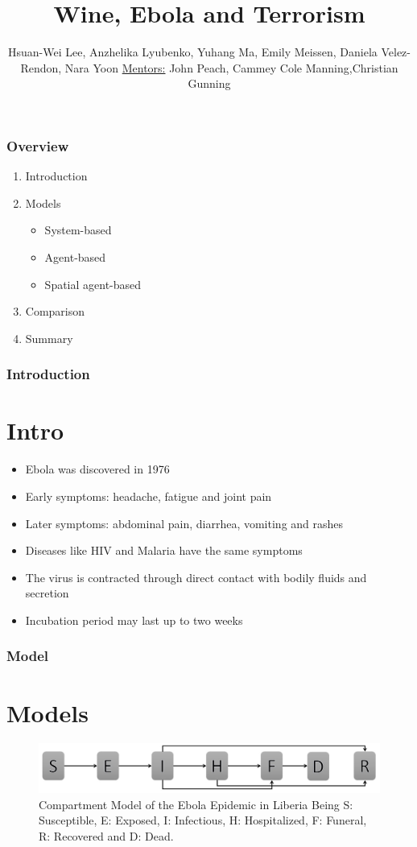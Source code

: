 \documentclass[30pt]{beamer}
\author{ Hsuan-Wei Lee,
  Anzhelika Lyubenko,
  Yuhang Ma,
  Emily Meissen,
  Daniela Velez-Rendon,
    Nara Yoon \newline \newline \underline{Mentors:} \newline John Peach, \newline Cammey Cole Manning,\newline Christian Gunning}
\title[]{Wine, Ebola and Terrorism}
\begin{document}
\begin{frame}[t,plain]
    \titlepage
\end{frame}

\begin{frame}[t,plain]
    \frametitle{Overview}
\begin{enumerate}
\vfill
\item Introduction
\item Models
\begin{itemize}
\item System-based
\item Agent-based
\item Spatial agent-based
\end{itemize}
\item Comparison
\item Summary
\end{enumerate}
\end{frame}

\begin{frame}
\frametitle{Introduction}
\section{Intro}
\begin{itemize}
\item Ebola was discovered in 1976
\item Early symptoms:  headache, fatigue and joint pain
\item Later symptoms: abdominal pain, diarrhea, vomiting and rashes
\item Diseases like HIV and Malaria have the same symptoms
\item The virus is contracted through direct contact with bodily fluids and secretion
\item Incubation period may last up to two weeks
\end{itemize}
\end{frame}




\begin{frame}
\frametitle{Model}
\section{Models}


\begin{figure}[!h]
  \centering
  \includegraphics[width=1\textwidth]{compartmentNoFlow}
  \caption{Compartment Model of the Ebola Epidemic in Liberia \newline  Being S: Susceptible, E: Exposed, I: Infectious, H: Hospitalized, F: Funeral,  R: Recovered and D: Dead. } 
\label{fig:compartment} 
\end{figure}
\end{frame}
\end{document}
